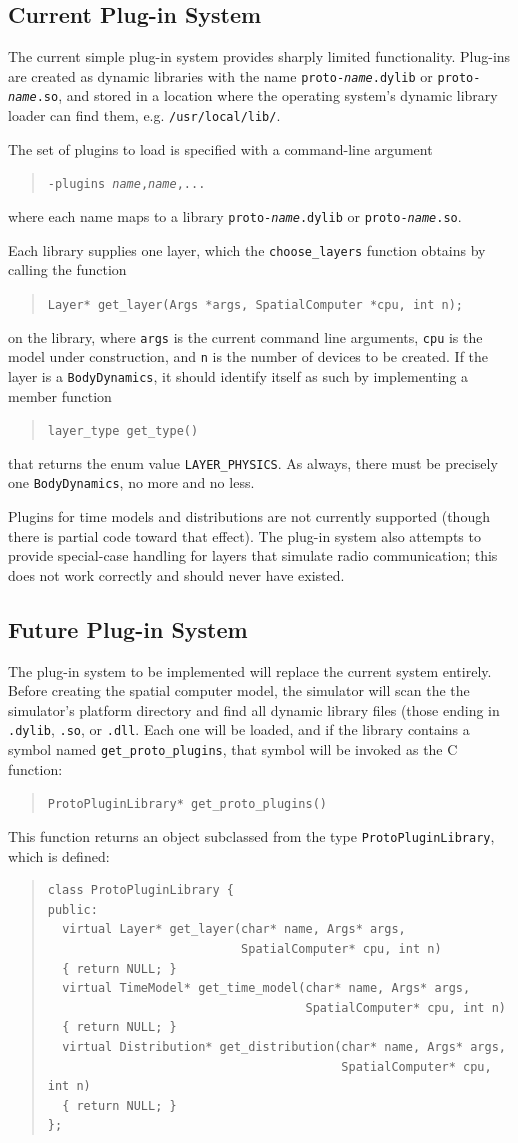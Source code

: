 \documentclass{article}
\newcommand\code[1]{\begin{quote}\var{#1}\end{quote}}
\newcommand\var[1]{{\tt #1}}
\begin{document}
\subsection{Current Plug-in System}

The current simple plug-in system provides sharply limited
functionality.  Plug-ins are created as dynamic libraries with the
name \var{proto-{\it name}.dylib} or \var{proto-{\it name}.so}, and
stored in a location where the operating system's dynamic library
loader can find them, e.g. {\tt /usr/local/lib/}.

The set of plugins to load is specified with a command-line argument
\code{-plugins {\it name},{\it name},...}
where each name maps to a library \var{proto-{\it name}.dylib} or
\var{proto-{\it name}.so}.

Each library supplies one layer, which the \var{choose\_layers}
function obtains by calling the function \code{Layer* get\_layer(Args
  *args, SpatialComputer *cpu, int n);} on the library, where
\var{args} is the current command line arguments, \var{cpu} is the
model under construction, and \var{n} is the number of devices to be
created.  If the layer is a \var{BodyDynamics}, it should identify
itself as such by implementing a member function \code{layer\_type
  get\_type()} that returns the enum value \var{LAYER\_PHYSICS}.  As
always, there must be precisely one \var{BodyDynamics}, no more and no
less.

Plugins for time models and distributions are not currently supported
(though there is partial code toward that effect).  The plug-in system
also attempts to provide special-case handling for layers that
simulate radio communication; this does not work correctly and should
never have existed.


\subsection{Future Plug-in System}

The plug-in system to be implemented will replace the current system
entirely.  Before creating the spatial computer model, the simulator
will scan the the simulator's platform directory and find all dynamic
library files (those ending in \var{.dylib}, \var{.so}, or \var{.dll}.
Each one will be loaded, and if the library contains a symbol named
\var{get\_proto\_plugins}, that symbol will be invoked as the C
function: \code{ProtoPluginLibrary* get\_proto\_plugins()}

This function returns an object subclassed from the type
\var{ProtoPluginLibrary}, which is defined:
\begin{quote}
\begin{verbatim}
class ProtoPluginLibrary {
public:
  virtual Layer* get_layer(char* name, Args* args, 
                           SpatialComputer* cpu, int n)
  { return NULL; }
  virtual TimeModel* get_time_model(char* name, Args* args, 
                                    SpatialComputer* cpu, int n)
  { return NULL; }
  virtual Distribution* get_distribution(char* name, Args* args, 
                                         SpatialComputer* cpu, int n)
  { return NULL; }
};
\end{verbatim}
\end{quote}
\end{document}
